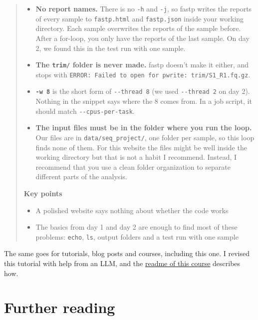 \documentclass[
  letterpaper,
  DIV=11,
  numbers=noendperiod]{scrreprt}
\providecommand{\tightlist}{%
  \setlength{\itemsep}{0pt}\setlength{\parskip}{0pt}}
\begin{document}
\begin{tcolorbox}
\begin{quote}
\begin{itemize}
\tightlist
\item
  \textbf{No report names.} There is no \texttt{-h} and \texttt{-j}, so
  fastp writes the reports of every sample to \texttt{fastp.html} and
  \texttt{fastp.json} inside your working directory. Each sample
  overwrites the reports of the sample before. After a for-loop, you
  only have the reports of the last sample. On day 2, we found this in
  the test run with one sample.
\item
  \textbf{The \texttt{trim/} folder is never made.} fastp doesn't make
  it either, and stops with
  \texttt{ERROR:\ Failed\ to\ open\ for\ pwrite:\ trim/S1\_R1.fq.gz}.
\item
  \textbf{\texttt{-w\ 8}} is the short form of \texttt{-\/-thread\ 8}
  (we used \texttt{-\/-thread\ 2} on day 2). Nothing in the snippet says
  where the 8 comes from. In a job script, it should match
  \texttt{-\/-cpus-per-task}.
\item
  \textbf{The input files must be in the folder where you run the loop.}
  Our files are in \texttt{data/seq\_project/}, one folder per sample,
  so this loop finds none of them. For this website the files might be
  well inside the working directory but that is not a habit I recommend.
  Instead, I recommend that you use a clean folder organization to
  separate different parts of the analysis.
\end{itemize}

\textbf{Key points}

\begin{itemize}
\tightlist
\item
  A polished website says nothing about whether the code works
\item
  The basics from day 1 and day 2 are enough to find most of these
  problems: \texttt{echo}, \texttt{ls}, output folders and a test run
  with one sample
\end{itemize}
\end{quote}

\end{tcolorbox}

The same goes for tutorials, blog posts and courses, including this one.
I revised this tutorial with help from an LLM, and the
\href{https://github.com/ndombrowski/cli_workshop\#use-of-ai-tools}{readme
of this course} describes how.

\section{Further reading}\label{further-reading}
\end{document}
